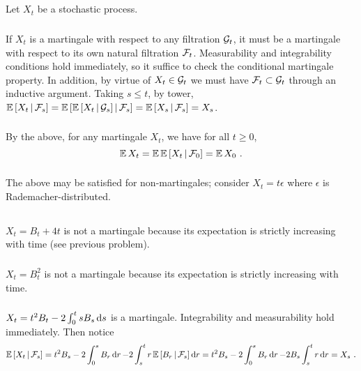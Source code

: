 \documentclass{article}
\begin{document}
  \subsection{}

  Let \(X_t\) be a stochastic process.
\subsubsection{}
If \(X_t\) is a martingale with respect to any filtration \(\mathcal{G}_t\), it must be a martingale with respect to its own natural filtration \(\mathcal{F}_t\). Measurability and integrability conditions hold immediately, so it suffice to check the conditional martingale property. In addition, by virtue of \(X_t\in \mathcal{G}_t\) we must have \(\mathcal{F}_t\subset\mathcal{G}_t\) through an inductive argument. Taking \(s\le t\), by tower, \(\operatorname{\mathbb{E}}\left[ X_t \,\middle|\, \mathcal{F}_s \right]=\operatorname{\mathbb{E}}\left[ \operatorname{\mathbb{E}}\left[ X_t \,\middle|\, \mathcal{G}_s \right] \,\middle|\, \mathcal{F}_s \right]=\operatorname{\mathbb{E}}\left[ X_s \,\middle|\, \mathcal{F}_s \right]=X_s\).
\subsubsection{}
By the above, for any martingale \(X_t\), we have for all \(t\ge 0\),
\[
  \operatorname{\mathbb{E}} X_t=\operatorname{\mathbb{E}}\operatorname{\mathbb{E}}\left[ X_t \,\middle|\, \mathcal{F}_0 \right]=\operatorname{\mathbb{E}} X_0\,\,.
\]
\subsubsection{}
The above may be satisfied for non-martingales; consider \(X_t=t\epsilon\) where \(\epsilon\) is Rademacher-distributed.
\subsection{}
\subsubsection{}
\(X_t=B_t+4t\) is not a martingale because its expectation is strictly increasing with time (see previous problem).
\subsubsection{}
\(X_t=B_t^2\) is not a martingale because its expectation is strictly increasing with time.
\subsubsection{}
\(X_t=t^2B_t-2\int_0^tsB_s\mathop{\mathrm{d} s }\) is a martingale. Integrability and measurability hold immediately. Then notice
\[
  \operatorname{\mathbb{E}}\left[ X_t \,\middle|\, \mathcal{F}_s \right]=t^2B_s-2\int_0^sB_r\mathop{\mathrm{d} r }-2\int_s^tr\operatorname{\mathbb{E}}\left[ B_r \,\middle|\, \mathcal{F}_s \right]\mathop{\mathrm{d} r }=t^2B_s-2\int_0^sB_r\mathop{\mathrm{d} r }-2B_s\int_s^tr\mathop{\mathrm{d} r }=X_s\,\,.
\]
\end{document}
